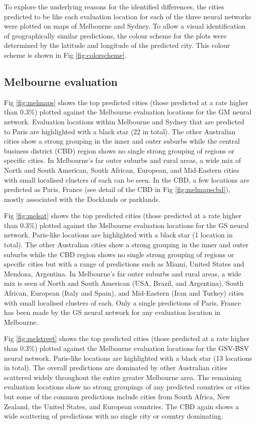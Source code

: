 \documentclass[10pt,letterpaper,hidelinks]{article}
\begin{document}
To explore the underlying reasons for the identified differences, the cities predicted to be like each evaluation location for each of the three neural networks were plotted on maps of Melbourne and Sydney. To allow a visual identification of geographically similar predictions, the colour scheme for the plots were determined by the latitude and longitude of the predicted city. This colour scheme is shown in Fig \ref{fig:colorscheme}. 


\subsection*{Melbourne evaluation} 

Fig \ref{fig:melmaps} shows the top predicted cities (those predicted at a rate higher than 0.3\%) plotted against the Melbourne evaluation locations for the GM neural network. Evaluation locations within Melbourne and Sydney that are predicted to Paris are highlighted with a black star (22 in total). The other Australian cities show a strong grouping in the inner and outer suburbs while the central business district (CBD) region shows no single strong grouping of regions or specific cities. In Melbourne's far outer suburbs and rural areas, a wide mix of North and South American, South African, European, and Mid-Eastern cities with small localised clusters of each can be seen. In the CBD, a few locations are predicted as Paris, France (see detail of the CBD in Fig \ref{fig:melmapscbd}), mostly associated with the Docklands or parklands.

Fig \ref{fig:melsat} shows the top predicted cities (those predicted at a rate higher than 0.3\%) plotted against the Melbourne evaluation locations for the GS neural network. Paris-like locations are highlighted with a black star (1 location in total). The other Australian cities show a strong grouping in the inner and outer suburbs while the CBD region shows no single strong grouping of regions or specific cities but with a range of predictions such as Miami, United States and Mendoza, Argentina. In Melbourne's far outer suburbs and rural areas, a wide mix is seen of North and South American (USA, Brazil, and Argentina), South African, European (Italy and Spain), and Mid-Eastern (Iran and Turkey) cities with small localised clusters of each. Only a single predictions of Paris, France has been made by the GS neural network for any evaluation location in Melbourne.

Fig \ref{fig:melstreet} shows the top predicted cities (those predicted at a rate higher than 0.3\%) plotted against the Melbourne evaluation locations for the GSV-BSV neural network. Paris-like locations are highlighted with a black star (13 locations in total). The overall predictions are dominated by other Australian cities scattered widely throughout the entire greater Melbourne area. The remaining evaluation locations show no strong groupings of any predicted countries or cities but some of the common predictions include cities from South Africa, New Zealand, the United States, and European countries. The CBD again shows a wide scattering of predictions with no single city or country dominating.
\end{document}
